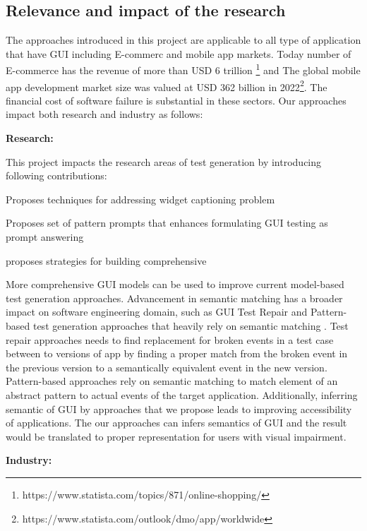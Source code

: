 \subsection{Relevance and impact of the research }
The approaches introduced in this project are applicable to all type of application that have GUI including E-commerc and mobile app markets.
Today number of E-commerce has the revenue of more than USD 6 trillion \footnote{https://www.statista.com/topics/871/online-shopping/} and 
The global mobile app development market size was valued at USD 362 billion in 2022\footnote{https://www.statista.com/outlook/dmo/app/worldwide}.
The financial cost of software failure is substantial in these sectors. 
Our approaches impact both research and industry as follows:




\smallskip
\noindent
\textbf{Research:}

\noindent
This project impacts the research areas of test generation by introducing following contributions:
\begin{inparaenum}[(i)]
\item Proposes techniques for addressing widget captioning problem
\item Proposes set of pattern prompts that enhances formulating GUI testing  as prompt answering
\item proposes strategies for building comprehensive \tam
\end{inparaenum}
More comprehensive GUI models can be used to improve current model-based test generation approaches.
Advancement in semantic matching has a broader impact on software engineering domain, such as GUI Test Repair and Pattern-based test generation approaches that heavily rely on semantic matching .
Test repair approaches needs to find replacement for broken events in a test case between to versions of app by finding a proper match from the broken event in the previous version to a semantically equivalent event in the new version.
Pattern-based approaches rely on semantic matching to match element of an abstract pattern to actual events of the target application.
Additionally, inferring semantic of GUI by approaches that we propose leads to improving accessibility of applications.
The our approaches can infers semantics of GUI and the result would be translated to proper representation for users with visual impairment.  


\smallskip
\noindent
\textbf{Industry:}

